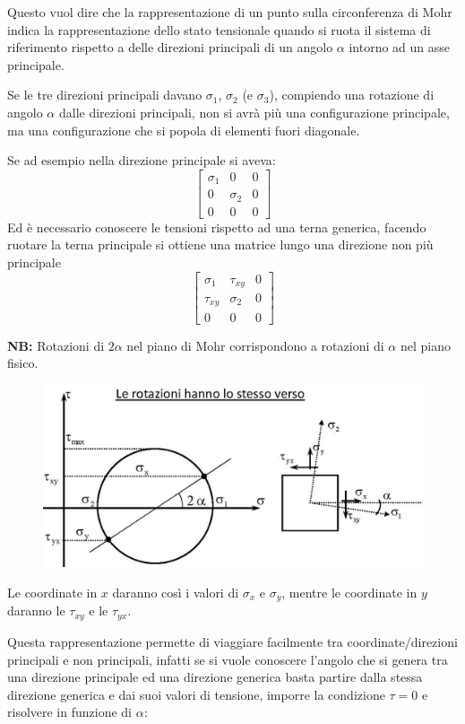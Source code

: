\documentclass{article}
\begin{document}
\begin{adjustwidth}{2in}{}
	Questo vuol dire che la rappresentazione di un punto sulla circonferenza di Mohr indica la rappresentazione dello stato tensionale quando si ruota il sistema di riferimento rispetto a delle direzioni principali di un angolo $\alpha$ intorno ad un asse principale. \newline
	
Se le tre direzioni principali davano $\sigma_1$, $\sigma_2$ (e $\sigma_3$), compiendo una rotazione di angolo $\alpha$  dalle direzioni principali, non si avrà più una configurazione principale, ma una configurazione che si popola di elementi fuori diagonale. \newline 

Se ad esempio nella direzione principale si aveva:
\[\left[ \begin{array}{ccc}
	\sigma_1 & 0 & 0 \\
	0 & \sigma_2 & 0 \\
	0 & 0 & 0 
\end{array}\right]\]
Ed è necessario conoscere le tensioni rispetto ad una terna generica, facendo ruotare la terna principale si ottiene una matrice lungo una direzione non più principale
\[\left[ \begin{array}{ccc}
	\sigma_1 & \tau_{xy} & 0 \\
	\tau_{xy} & \sigma_2 & 0 \\
	0 & 0 & 0 
\end{array}\right]\]

\textbf{NB:} Rotazioni di $2\alpha$ nel piano di Mohr corrispondono a rotazioni di $\alpha$ nel piano fisico.

\begin{figure}[H]
	\centering
	\includegraphics[width=0.7\linewidth]{immagini/1.PARTE7_Pagina_40}
\end{figure} 

Le coordinate in $x$ daranno così i valori di $\sigma_x$ e $\sigma_y$, mentre le coordinate in $y$ daranno le $\tau_{xy}$ e le $\tau_{yx}$. \newline 

	Questa rappresentazione permette di viaggiare facilmente tra coordinate/direzioni principali e non principali, infatti se si vuole conoscere l'angolo che si genera tra una direzione principale ed una direzione generica basta partire dalla stessa direzione generica e dai suoi valori di tensione, imporre la condizione $\tau = 0$ e risolvere in funzione di $\alpha$:


\end{adjustwidth}
\end{document}
